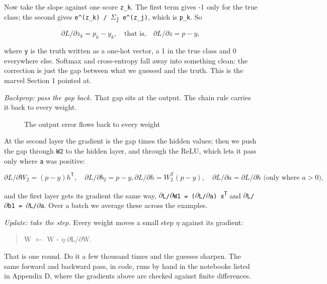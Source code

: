 \documentclass[11pt]{article} %
\begin{document}
Now take the slope against one score \texttt{z\_k}. The first term gives -1 only for the true class; the second gives \texttt{e\textasciicircum{}(z\_k) / $\Sigma$\textsubscript{j} e\textasciicircum{}(z\_j)}, which is \texttt{p\_k}. So


\[
\partial L/\partial z_k = p_k - y_k, \quad \text{that is,} \quad \partial L/\partial z = p - y,
\]


where \texttt{y} is the truth written as a one-hot vector, a 1 in the true class and 0 everywhere else. Softmax and cross-entropy fall away into something clean: the correction is just the gap between what we guessed and the truth. This is the marvel Section 1 pointed at.

\emph{Backprop: pass the gap back.} That gap sits at the output. The chain rule carries it back to every weight.

\begin{figure}[htbp]
\centering

\caption{The output error flows back to every weight}
\end{figure}


At the second layer the gradient is the gap times the hidden values; then we push the gap through \texttt{W2} to the hidden layer, and through the ReLU, which lets it pass only where \texttt{a} was positive:


\[
\partial L/\partial W_{2} = (p - y) h^{\mathsf{T}}, \quad \partial L/\partial b_{2} = p - y, \partial L/\partial h = W_{2}^{\mathsf{T}}(p - y), \quad \partial L/\partial a = \partial L/\partial h  \text{ (only where } a>0 \text{)},
\]


and the first layer gets its gradient the same way, \texttt{$\partial$L/$\partial$W1 = ($\partial$L/$\partial$a) x\textsuperscript{T}} and \texttt{$\partial$L/$\partial$b1 = $\partial$L/$\partial$a}. Over a batch we average these across the examples.

\emph{Update: take the step.} Every weight moves a small step \texttt{$\eta$} against its gradient:


\begin{quote}
W $\leftarrow$ W - $\eta$ $\partial$L/$\partial$W.
\end{quote}


That is one round. Do it a few thousand times and the guesses sharpen. The same forward and backward pass, in code, runs by hand in the notebooks listed in Appendix D, where the gradients above are checked against finite differences.
\end{document}
